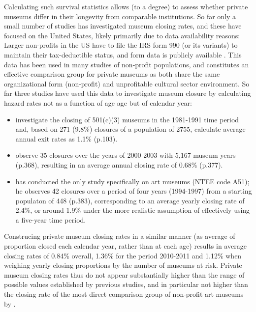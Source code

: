 \documentclass[12pt]{article}
\begin{document}
Calculating such survival statistics allows (to a degree) to assess whether private museums differ in their longevity from comparable institutions.
So far only a small number of studies has investigated museum closing rates, and these have focused on the United States, likely primarily due to data availability reasons: 
Larger non-profits in the US have to file the IRS form 990 (or its variants) to maintain their tax-deductible status, and form data is publicly available \parencite{Lecy_2023_core,Lecy_2023_core}.
This data has been used in many studies of non-profit populations, and constitutes an effective comparison group for private museums as both share the same organizational form (non-profit) and unprofitable cultural sector environment.
So far three studies have used this data to investigate museum closure by calculating hazard rates not as a function of age age but of calendar year:
\begin{itemize}
\item \textcite{Bowen_etal_1994_charitable} investigate the closing of 501(c)(3) museums in the 1981-1991 time period and, based on 271 (9.8\%) closures of a population of 2755, calculate average annual exit rates as 1.1\% (p.103).
\item \textcite{Gordon_etal_2013_insolvency} observe 35 closures over the years of 2000-2003 with 5,167 museum-years (p.368), resulting in an average annual closing rate of 0.68\% (p.377).
\item \textcite{Hager_2001_vulnerability} has conducted the only study specifically on art museums (NTEE code A51); he observes 42 closures over a period of four years (1994-1997) from a starting populaton of 448 (p.383), corresponding to an average yearly closing rate of 2.4\%, or around 1.9\% under the more realistic assumption of effectively using a five-year time period.
\end{itemize}

Construcing private museum closing rates in a similar manner (as average of proportion closed each calendar year, rather than at each age) results in average closing rates of 0.84\% overall, 1.36\% for the period 2010-2011 and 1.12\% when weighing yearly closing proportions by the number of museums at risk.
Private museum closing rates thus do not appear substantially higher than the range of possible values established by previous studies, and in particular not higher than the closing rate of the most direct comparison group of non-profit art museums by \textcite{Hager_2001_vulnerability}. 
\end{document}
